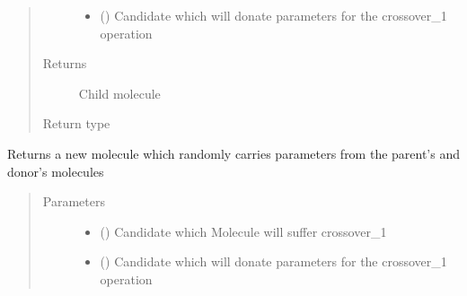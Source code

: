 \documentclass[letterpaper,10pt,english]{sphinxmanual}
\begin{document}
\begin{fulllineitems}
\begin{fulllineitems}
\begin{quote}
\begin{description}
\begin{itemize}
\item {} 
\sphinxAtStartPar
{} ({\hyperref[\detokenize{genetic:genetic.Chromosome}]{}}) \textendash{} Candidate which will donate parameters for the crossover\_1 operation

\end{itemize}

\item[{Returns}] \leavevmode
\sphinxAtStartPar
Child molecule

\item[{Return type}] \leavevmode
\sphinxAtStartPar
{\hyperref[\detokenize{molecular:molecular.Molecule}]{}}

\end{description}\end{quote}

\end{fulllineitems}


\begin{fulllineitems}
\label{\detokenize{MolOpt:MolOpt.MolOpt.crossover_n}}
\sphinxAtStartPar
Returns a new molecule which randomly carries parameters from the parent’s and donor’s molecules
\begin{quote}\begin{description}
\item[{Parameters}] \leavevmode\begin{itemize}
\item {} 
\sphinxAtStartPar
{} ({\hyperref[\detokenize{genetic:genetic.Chromosome}]{}}) \textendash{} Candidate which Molecule will suffer crossover\_1

\item {} 
\sphinxAtStartPar
{} ({\hyperref[\detokenize{genetic:genetic.Chromosome}]{}}) \textendash{} Candidate which will donate parameters for the crossover\_1 operation


\end{itemize}
\end{description}
\end{quote}
\end{fulllineitems}
\end{fulllineitems}
\end{document}
